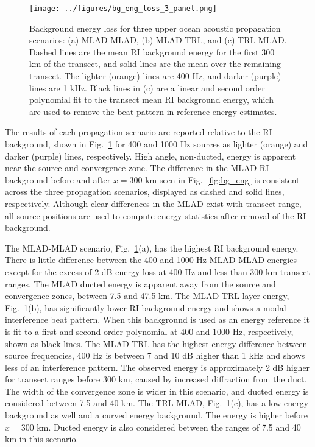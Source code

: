 \documentclass[preprint,NumberedRefs]{JASA}
\begin{document}
\begin{figure}
\texttt{[image: ../figures/bg\_eng\_loss\_3\_panel.png]}
        \caption{Background energy loss for three upper ocean acoustic propagation scenarios: (a) MLAD-MLAD, (b) MLAD-TRL, and (c) TRL-MLAD. Dashed lines are the mean RI background energy for the first 300 km of the transect, and solid lines are the mean over the remaining transect. The lighter (orange) lines are 400 Hz, and darker (purple) lines are 1 kHz. Black lines in (c) are a linear and second order polynomial fit to the transect mean RI background energy, which are used to remove the beat pattern in reference energy estimates.}
    \label{fig:eng_bg_3}
\end{figure}

The results of each propagation scenario are reported relative to the RI background, shown in Fig.~\ref{fig:eng_bg_3} for 400 and 1000 Hz sources as lighter (orange) and darker (purple) lines, respectively. High angle, non-ducted, energy is apparent near the source and convergence zone. The difference in the MLAD RI background before and after $x=300$ km seen in Fig.~\ref{fig:bg_eng} is consistent across the three propagation scenarios, displayed as dashed and solid lines, respectively. Although clear differences in the MLAD exist with transect range, all source positions are used to compute energy statistics after removal of the RI background.

The MLAD-MLAD scenario, Fig.~\ref{fig:eng_bg_3}(a), has the highest RI background energy. There is little difference between the 400 and 1000 Hz MLAD-MLAD energies except for the excess of 2 dB energy loss at 400 Hz and less than 300 km transect ranges. The MLAD ducted energy is apparent away from the source and convergence zones, between 7.5 and 47.5 km. The MLAD-TRL layer energy, Fig.~\ref{fig:eng_bg_3}(b), has significantly lower RI background energy and shows a modal interference beat pattern. When this background is used as an energy reference it is fit to a first and second order polynomial at 400 and 1000 Hz, respectively, shown as black lines. The MLAD-TRL has the highest energy difference between source frequencies, 400 Hz is between 7 and 10 dB higher than 1 kHz and shows less of an interference pattern. The observed energy is approximately 2 dB higher for transect ranges before 300 km, caused by increased diffraction from the duct. The width of the convergence zone is wider in this scenario, and ducted energy is considered between 7.5 and 40 km. The TRL-MLAD, Fig.~\ref{fig:eng_bg_3}(c), has a low energy background as well and a curved energy background. The energy is higher before $x=300$ km. Ducted energy is also considered between the ranges of 7.5 and 40 km in this scenario.
\end{document}
